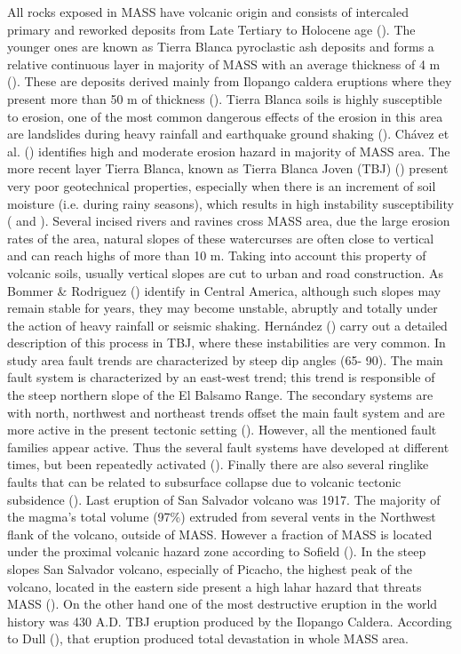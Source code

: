 \documentclass[11pt,twoside]{rmta2010esp}%
\begin{document}
All rocks exposed in MASS have volcanic origin and consists of intercaled primary and reworked deposits from Late Tertiary to Holocene age (\cite{schmidt1975}). The younger ones are known as Tierra Blanca pyroclastic ash deposits and forms a relative continuous layer in majority of MASS with an average thickness of 4 m (\cite{schmidt1975}). These are deposits derived mainly from Ilopango caldera eruptions where they present more than 50 m of thickness (\cite{schmidt1975}). Tierra Blanca soils is highly susceptible to erosion, one of the most common dangerous effects of the erosion in this area are landslides during heavy rainfall and earthquake ground shaking (\cite{schmidt1975}). Chávez et al. (\cite{chavez2014a}) identifies high and moderate erosion hazard in majority of MASS area. The more recent layer Tierra Blanca, known as Tierra Blanca Joven (TBJ) (\cite{hernan2004}) present very poor geotechnical properties, especially when there is an increment of soil moisture (i.e. during rainy seasons), which results in high instability susceptibility (\cite{chavez2014b} and \cite{rolo2004}). Several incised rivers and ravines cross MASS area, due the large erosion rates of the area, natural slopes of these watercurses are often close to vertical and can reach highs of more than 10 m. Taking into account this property of volcanic soils, usually vertical slopes are cut to urban and road construction. As Bommer \& Rodriguez (\cite{bommer}) identify in Central America, although such slopes may remain stable for years, they may become unstable, abruptly and totally under the action of heavy rainfall or seismic shaking. Hernández (\cite{hernan2004}) carry out a detailed description of this process in TBJ, where these instabilities are very common. 
In study area fault trends are characterized by steep dip angles (65\textdegree - 90\textdegree). The main fault system is characterized by an east-west trend; this trend is responsible of the steep northern slope of the El Balsamo Range.  The secondary systems are with north, northwest and northeast trends offset the main fault system and are more active in the present tectonic setting (\cite{schmidt1975}). However, all the mentioned fault families appear active. Thus the several fault systems have developed at different times, but been repeatedly activated (\cite{rymer1987}).   Finally there are also several ringlike faults that can be related to subsurface collapse due to volcanic tectonic subsidence (\cite{schmidt1975}).
Last eruption of San Salvador volcano was 1917.  The majority of the magma's total volume (97\%) extruded from several vents in the Northwest flank of the volcano, outside of MASS. However a fraction of MASS is located under the proximal volcanic hazard zone according to Sofield (\cite{sofield2004}). In the steep slopes  San Salvador volcano, especially of Picacho, the highest peak of the volcano, located in the eastern side present a high lahar hazard that threats MASS (\cite{major2004}). On the other hand one of the most destructive eruption in the world history was 430 A.D. TBJ eruption produced by the Ilopango Caldera. According to Dull (\cite{dull2004}), that eruption produced total devastation in whole MASS area. 
\end{document}
